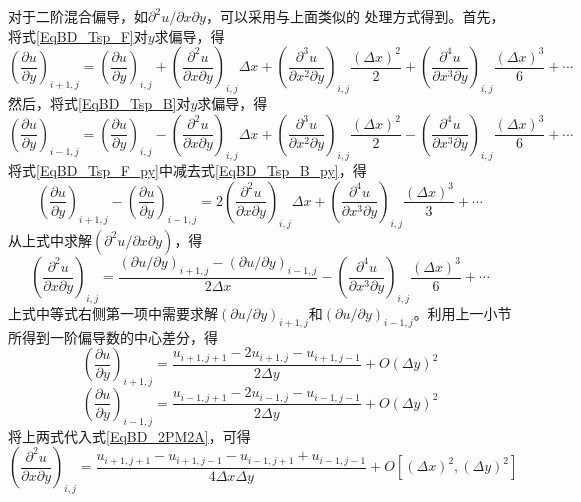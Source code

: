 对于二阶混合偏导，如$\partial^{2} u/\partial x\partial y$，可以采用与上面类似的
处理方式得到。首先，将式\eqref{EqBD_Tsp_F}对$y$求偏导，得
\begin{equation}
  \left(
    \frac{\partial u}{\partial y}
  \right)_{i+1,j}
  =
  \left(
    \frac{\partial u}{\partial y}
  \right)_{i,j}
  +
  \left(
    \frac{\partial^{2} u}{\partial x\partial y}
  \right)_{i,j}\Delta x
  +
  \left(
    \frac{\partial^{3} u}{\partial x^{2}\partial y}
  \right)_{i,j}\frac{(\Delta x)^{2}}{2} 
  +
  \left(
    \frac{\partial^{4} u}{\partial x^{3}\partial y}
  \right)_{i,j}\frac{(\Delta x)^{3}}{6} 
  +
  \cdots
  \label{EqBD_Tsp_F_py}
\end{equation}
然后，将式\eqref{EqBD_Tsp_B}对$y$求偏导，得
\begin{equation}
  \left(
    \frac{\partial u}{\partial y}
  \right)_{i-1,j}
  =
  \left(
    \frac{\partial u}{\partial y}
  \right)_{i,j}
  -
  \left(
    \frac{\partial^{2} u}{\partial x\partial y}
  \right)_{i,j}\Delta x
  +
  \left(
    \frac{\partial^{3} u}{\partial x^{2}\partial y}
  \right)_{i,j}\frac{(\Delta x)^{2}}{2} 
  -
  \left(
    \frac{\partial^{4} u}{\partial x^{3}\partial y}
  \right)_{i,j}\frac{(\Delta x)^{3}}{6} 
  +
  \cdots
  \label{EqBD_Tsp_B_py}
\end{equation}
将式\eqref{EqBD_Tsp_F_py}中减去式\eqref{EqBD_Tsp_B_py}，得
\begin{equation}
  \left(
    \frac{\partial u}{\partial y}
  \right)_{i+1,j}
  -
  \left(
    \frac{\partial u}{\partial y}
  \right)_{i-1,j}
  =
  2
  \left(
    \frac{\partial^{2} u}{\partial x\partial y}
  \right)_{i,j}\Delta x
  +
  \left(
    \frac{\partial^{4} u}{\partial x^{3}\partial y}
  \right)_{i,j}\frac{(\Delta x)^{3}}{3} 
  +
  \cdots
\end{equation}
从上式中求解$(\partial^{2}u/\partial x\partial y)$，得
\begin{equation}
  \left(
    \frac{\partial^{2} u}{\partial x\partial y}
  \right)_{i,j}
  =
  \frac{(\partial u/\partial y)_{i+1,j}-(\partial u/\partial y)_{i-1,j}}{2\Delta x}
  -
  \left(
    \frac{\partial^{4} u}{\partial x^{3}\partial y}
  \right)_{i,j}\frac{(\Delta x)^{3}}{6} 
  +
  \cdots
  \label{EqBD_2PM2A}
\end{equation}
上式中等式右侧第一项中需要求解$(\partial u/\partial y)_{i+1,j}$和$(\partial
u/\partial y)_{i-1,j}$。利用上一小节所得到一阶偏导数的中心差分，得
\begin{equation}
  \left(
    \frac{\partial u}{\partial y}
  \right)_{i+1,j}
  =
  \frac{u_{i+1,j+1}-2u_{i+1,j}-u_{i+1,j-1}}{2\Delta y} + O(\Delta y)^{2}
\end{equation}
\begin{equation}
  \left(
    \frac{\partial u}{\partial y}
  \right)_{i-1,j}
  =
  \frac{u_{i-1,j+1}-2u_{i-1,j}-u_{i-1,j-1}}{2\Delta y} + O(\Delta y)^{2}
\end{equation}
将上两式代入式\eqref{EqBD_2PM2A}，可得
\begin{equation}
  \left(
    \frac{\partial^{2} u}{\partial x\partial y}
  \right)_{i,j}
  =
  \frac{u_{i+1,j+1}-u_{i+1,j-1}-u_{i-1,j+1}+u_{i-1,j-1}}{4\Delta x\Delta y}
  +
  O[(\Delta x)^{2},(\Delta y)^{2}]
\end{equation}

